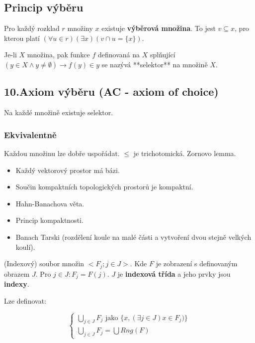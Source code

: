 \subsection{Princip výběru}

Pro každý rozklad $r$ množiny $x$ existuje \textbf{výběrová množina}. To jest $v \subseteq x$, pro kterou platí $(\forall u \in r)(\exists x)( v \cap u = \{x\})$.

\begin{definice}
	Je-li $X$ množina, pak funkce $f$ definovaná na $X$ splňující $(y \in X \land y \neq \emptyset) \rightarrow f(y) \in y$ se nazývá **selektor** na množině $X$.
\end{definice}

\subsection{10.Axiom výběru (AC - axiom of choice)}

Na každé množině existuje selektor.

\subsubsection{Ekvivalentně}

Každou množinu lze dobře uspořádat. $\leq$ je trichotomická. Zornovo lemma.

\begin{dusl}
	\begin{itemize}
		\item Každý vektorový prostor má bázi.
		\item Součin kompaktních topologických prostorů je kompaktní.
		\item Hahn-Banachova věta.
		\item Princip kompaktnosti.
		\item Banach Tarski (rozdělení koule na malé části a vytvoření dvou stejně velkých koulí).
	\end{itemize}
\end{dusl}

\begin{definice}
	(Indexový) soubor množin $<F_{j}; j \in J>$. Kde $F$ je zobrazení s definovaným obrazem $J$. Pro $j \in J: F_{j} = F(j)$. $J$ je \textbf{indexová třída} a jeho prvky jsou \textbf{indexy}.
\end{definice}

Lze definovat:

$$
\left\{
\begin{array}{l}
	\bigcup_{j \in J} F_{j} \text{ jako } \{x, (\exists j \in J) x \in F_{j})\} \\
	\bigcup_{j \in J} F_{j} = \bigcup Rng(F)
\end{array}
\right.
$$

